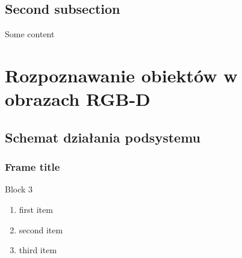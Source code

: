 \documentclass{beamer}
\begin{document}
\subsection{Second subsection}
\begin{frame}
Some content
\end{frame}

\section{Rozpoznawanie obiektów w obrazach RGB-D}

\subsection{Schemat działania podsystemu}

\begin{frame}
\frametitle{Frame title}
\fboxsep=0pt
\hfill

\begin{minipage}[t]{0.48\linewidth}
\begin{block}{Block 3}
\begin{enumerate}
\item first item
\item second item
\item third item
\end{enumerate}
\end{block}
\end{minipage}


\end{frame}



\end{document}
